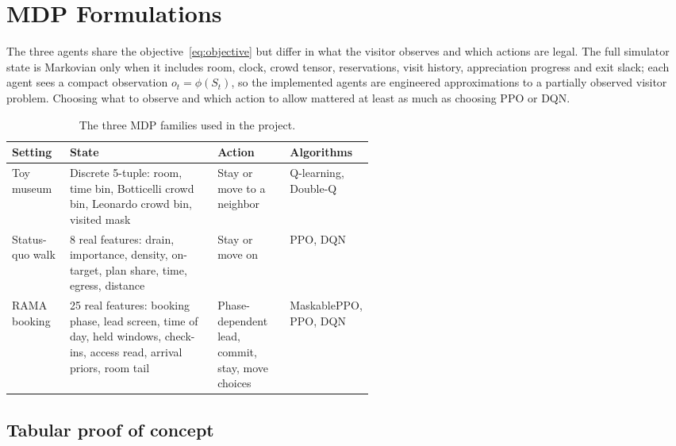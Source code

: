 \documentclass[11pt]{article}
\numberwithin{equation}{section} %
\begin{document}
\section{MDP Formulations}
\label{sec:mdp}

The three agents share the objective~\eqref{eq:objective} but differ in what the visitor observes and which
actions are legal. The full simulator state is Markovian only when it includes room, clock, crowd tensor,
reservations, visit history, appreciation progress and exit slack; each agent sees a compact observation
$o_t=\phi(S_t)$, so the implemented agents are engineered approximations to a partially observed visitor
problem. Choosing what to observe and which action to allow mattered at least as much as choosing PPO or DQN.

\begin{table}[t]
\centering
\small
\caption{The three MDP families used in the project.}
\label{tab:mdps}
\begin{tabularx}{\linewidth}{@{}P{0.16\linewidth}Y P{0.20\linewidth}P{0.17\linewidth}@{}}
\toprule
Setting & State & Action & Algorithms \\
\midrule
Toy museum &
Discrete 5-tuple: room, time bin, Botticelli crowd bin, Leonardo crowd bin, visited mask &
Stay or move to a neighbor &
Q-learning, Double-Q \\
Status-quo walk &
8 real features: drain, importance, density, on-target, plan share, time, egress, distance &
Stay or move on &
PPO, DQN \\
RAMA booking &
25 real features: booking phase, lead screen, time of day, held windows, check-ins, access read,
arrival priors, room tail &
Phase-dependent lead, commit, stay, move choices &
MaskablePPO, PPO, DQN \\
\bottomrule
\end{tabularx}
\end{table}

\subsection{Tabular proof of concept}
\end{document}
